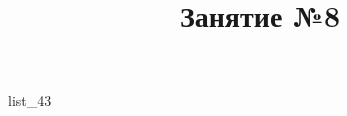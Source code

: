 \documentclass[12pt, a4paper]{article}
\begin{document}
	\title{Занятие №8}
	{list_43}
\end{document}
